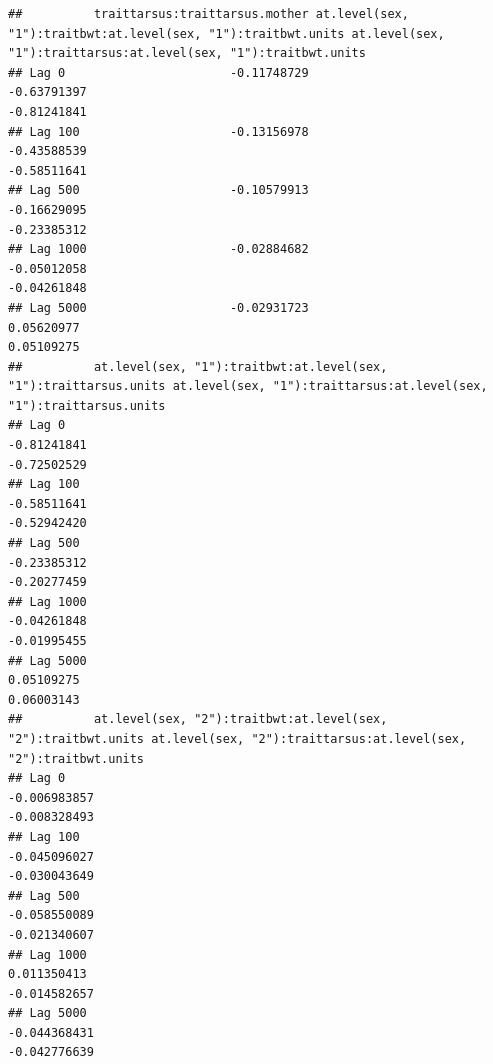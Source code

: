 \documentclass[
  12pt,
]{book}
\begin{document}
\begin{verbatim}
##          traittarsus:traittarsus.mother at.level(sex, "1"):traitbwt:at.level(sex, "1"):traitbwt.units at.level(sex, "1"):traittarsus:at.level(sex, "1"):traitbwt.units
## Lag 0                       -0.11748729                                                   -0.63791397                                                      -0.81241841
## Lag 100                     -0.13156978                                                   -0.43588539                                                      -0.58511641
## Lag 500                     -0.10579913                                                   -0.16629095                                                      -0.23385312
## Lag 1000                    -0.02884682                                                   -0.05012058                                                      -0.04261848
## Lag 5000                    -0.02931723                                                    0.05620977                                                       0.05109275
##          at.level(sex, "1"):traitbwt:at.level(sex, "1"):traittarsus.units at.level(sex, "1"):traittarsus:at.level(sex, "1"):traittarsus.units
## Lag 0                                                         -0.81241841                                                         -0.72502529
## Lag 100                                                       -0.58511641                                                         -0.52942420
## Lag 500                                                       -0.23385312                                                         -0.20277459
## Lag 1000                                                      -0.04261848                                                         -0.01995455
## Lag 5000                                                       0.05109275                                                          0.06003143
##          at.level(sex, "2"):traitbwt:at.level(sex, "2"):traitbwt.units at.level(sex, "2"):traittarsus:at.level(sex, "2"):traitbwt.units
## Lag 0                                                     -0.006983857                                                     -0.008328493
## Lag 100                                                   -0.045096027                                                     -0.030043649
## Lag 500                                                   -0.058550089                                                     -0.021340607
## Lag 1000                                                   0.011350413                                                     -0.014582657
## Lag 5000                                                  -0.044368431                                                     -0.042776639

\end{verbatim}
\end{document}
